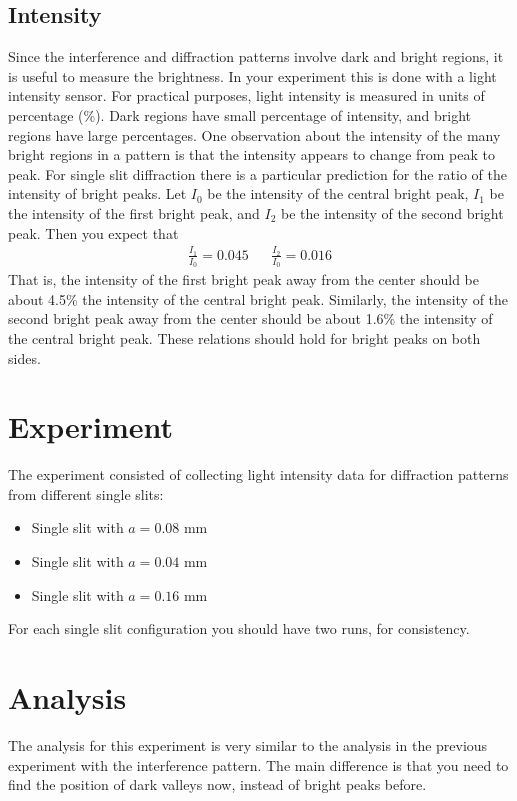 \subsection{Intensity}
Since the interference and diffraction patterns involve dark and bright regions, it is useful to measure the brightness. In your experiment this is done with a light intensity sensor. For practical purposes, light intensity is measured in units of percentage (\%). Dark regions have small percentage of intensity, and bright regions have large percentages. One observation about the intensity of the many bright regions in a pattern is that the intensity appears to change from peak to peak. For single slit diffraction there is a particular prediction for the ratio of the intensity of bright peaks. Let $I_{0}$ be the intensity of the central bright peak, $I_{1}$ be the intensity of the first bright peak, and $I_{2}$ be the intensity of the second bright peak. Then you expect that
\begin{align}
    \frac{I_{1}}{I_{0}} = 0.045 && \frac{I_{2}}{I_{0}} = 0.016
\end{align}
That is, the intensity of the first bright peak away from the center should be about 4.5\% the intensity of the central bright peak. Similarly, the intensity of the second bright peak away from the center should be about 1.6\% the intensity of the central bright peak. These relations should hold for bright peaks on both sides.
\section{Experiment}
The experiment consisted of collecting light intensity data for diffraction patterns from different single slits:
\begin{itemize}
    \item Single slit with $a = 0.08$ mm
    \item Single slit with $a = 0.04$ mm
    \item Single slit with $a = 0.16$ mm
\end{itemize}
For each single slit configuration you should have two runs, for consistency.
\section{Analysis}
The analysis for this experiment is very similar to the analysis in the previous experiment with the interference pattern. The main difference is that you need to find the position of dark valleys now, instead of bright peaks before.

